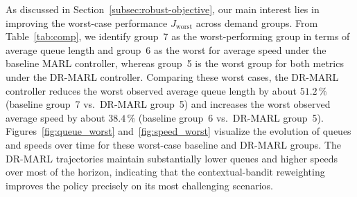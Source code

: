 \documentclass{ifacconf}
\newcommand{\1}{\mbox{1}\hspace{-0.25em}\mbox{l}}
\begin{document}
\begin{table}[t!]
    \centering
    \caption{Comparison of MARL and DR-MARL performance (horizon-and-rollout-averaged).}
    \label{tab:comp}
\end{table}


As discussed in Section~\ref{subsec:robust-objective}, our main interest lies in improving the worst-case performance $J_{\mathrm{worst}}$ across demand groups. From Table~\ref{tab:comp}, we identify group~7 as the worst-performing group in terms of average queue length and group~6 as the worst for average speed under the baseline MARL controller, whereas group~5 is the worst group for both metrics under the DR-MARL controller. Comparing these worst cases, the DR-MARL controller reduces the worst observed average queue length by about $51.2\,\%$ (baseline group~7 vs.\ DR-MARL group~5) and increases the worst observed average speed by about $38.4\,\%$ (baseline group~6 vs.\ DR-MARL group~5). Figures~\ref{fig:queue_worst} and~\ref{fig:speed_worst} visualize the evolution of queues and speeds over time for these worst-case baseline and DR-MARL groups. The DR-MARL trajectories maintain substantially lower queues and higher speeds over most of the horizon, indicating that the contextual-bandit reweighting improves the policy precisely on its most challenging scenarios.
\end{document}
